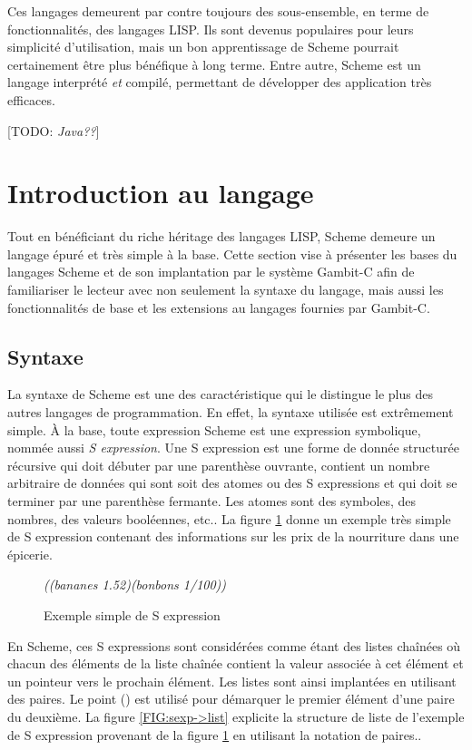 \documentclass[12pt,oneside,letterpaper,francais]{book}
\newcommand{\todo}[1]{[TODO: {\it #1}]}
\newcommand{\scheme}[1]{\selectlanguage{english}{\tt #1}\selectlanguage{french}}
\newcommand{\schemeresult}[1]{{\it #1}}
\begin{document}
Ces langages demeurent par contre toujours des sous-ensemble, en terme
de fonctionnalités, des langages LISP. Ils sont devenus populaires
pour leurs simplicité d'utilisation, mais un bon apprentissage de
Scheme pourrait certainement être plus bénéfique à long terme. Entre
autre, Scheme est un langage interprété \emph{et} compilé, permettant
de développer des application très efficaces.


\todo{Java??}


\section{Introduction au langage}
Tout en bénéficiant du riche héritage des langages LISP, Scheme
demeure un langage épuré et très simple à la base. Cette section vise
à présenter les bases du langages Scheme et de son implantation par le
système Gambit-C afin de familiariser le lecteur avec non seulement la
syntaxe du langage, mais aussi les fonctionnalités de base et les
extensions au langages fournies par Gambit-C.

\subsection{Syntaxe}
La syntaxe de Scheme est une des caractéristique qui le distingue le
plus des autres langages de programmation. En effet, la syntaxe
utilisée est extrêmement simple. À la base, toute expression Scheme
est une expression symbolique, nommée aussi \textit{S expression}. Une
S expression est une forme de donnée structurée récursive qui doit
débuter par une parenthèse ouvrante, contient un nombre arbitraire de
données qui sont soit des atomes ou des S expressions et qui doit se
terminer par une parenthèse fermante. Les atomes sont des symboles,
des nombres, des valeurs booléennes, etc.. La figure \ref{FIG:sexp}
donne un exemple très simple de S expression contenant des
informations sur les prix de la nourriture dans une épicerie.\\

\begin{figure}[htb!]
  \schemeresult{((bananes 1.52)(bonbons 1/100))}
  \caption{Exemple simple de S expression}
  \label{FIG:sexp}
\end{figure}

En Scheme, ces S expressions sont considérées comme étant des listes
chaînées où chacun des éléments de la liste chaînée contient la valeur
associée à cet élément et un pointeur vers le prochain élément. Les
listes sont ainsi implantées en utilisant des paires. Le point
(\scheme{.}) est utilisé pour démarquer le premier élément d'une paire
du deuxième. La figure \ref{FIG:sexp->list} explicite la structure de
liste de l'exemple de S expression provenant de la figure
\ref{FIG:sexp} en utilisant la notation de paires..\\
\end{document}
